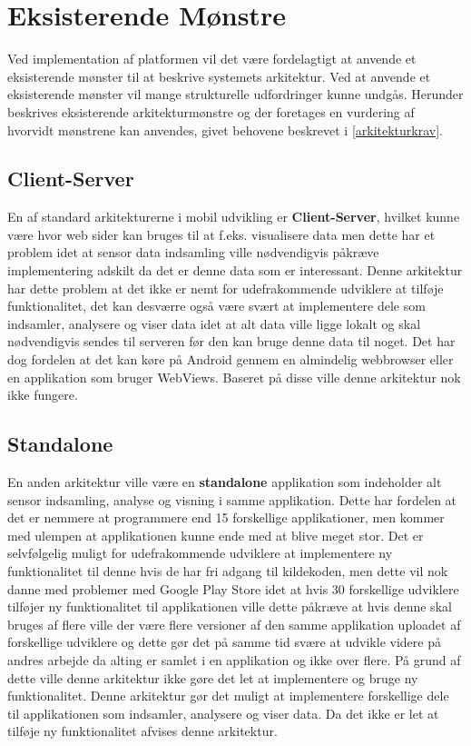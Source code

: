 \section{Eksisterende Mønstre}
Ved implementation af platformen vil det være fordelagtigt at anvende et eksisterende mønster til at beskrive systemets arkitektur.
Ved at anvende et eksisterende mønster vil mange strukturelle udfordringer kunne undgås.
Herunder beskrives eksisterende arkitekturmønstre og der foretages en vurdering af hvorvidt mønstrene kan anvendes, givet behovene beskrevet i \cref{arkitekturkrav}.

\subsection{Client-Server}
En af standard arkitekturerne i mobil udvikling er \textbf{Client-Server}, hvilket kunne være hvor web sider kan bruges til at f.eks. visualisere data men dette har et problem idet at sensor data indsamling ville nødvendigvis påkræve implementering adskilt da det er denne data som er interessant.
Denne arkitektur har dette problem at det ikke er nemt for udefrakommende udviklere at tilføje funktionalitet, det kan desværre også være svært at implementere dele som indsamler, analysere og viser data idet at alt data ville ligge lokalt og skal nødvendigvis sendes til serveren før den kan bruge denne data til noget. 
Det har dog fordelen at det kan køre på Android gennem en almindelig webbrowser eller en applikation som bruger WebViews.
Baseret på disse ville denne arkitektur nok ikke fungere.
\subsection{Standalone}
En anden arkitektur ville være en \textbf{standalone} applikation som indeholder alt sensor indsamling, analyse og visning i samme applikation.
Dette har fordelen at det er nemmere at programmere end 15 forskellige applikationer, men kommer med ulempen at applikationen kunne ende med at blive meget stor.
Det er selvfølgelig muligt for udefrakommende udviklere at implementere ny funktionalitet til denne hvis de har fri adgang til kildekoden, men dette vil nok danne med problemer med Google Play Store idet at hvis 30 forskellige udviklere tilføjer ny funktionalitet til applikationen ville dette påkræve at hvis denne skal bruges af flere ville der være flere versioner af den samme applikation uploadet af forskellige udviklere og dette gør det på samme tid svære at udvikle videre på andres arbejde da alting er samlet i en applikation og ikke over flere.
På grund af dette ville denne arkitektur ikke gøre det let at implementere og bruge ny funktionalitet.
Denne arkitektur gør det muligt at implementere forskellige dele til applikationen som indsamler, analysere og viser data.
Da det ikke er let at tilføje ny funktionalitet afvises denne arkitektur. 

